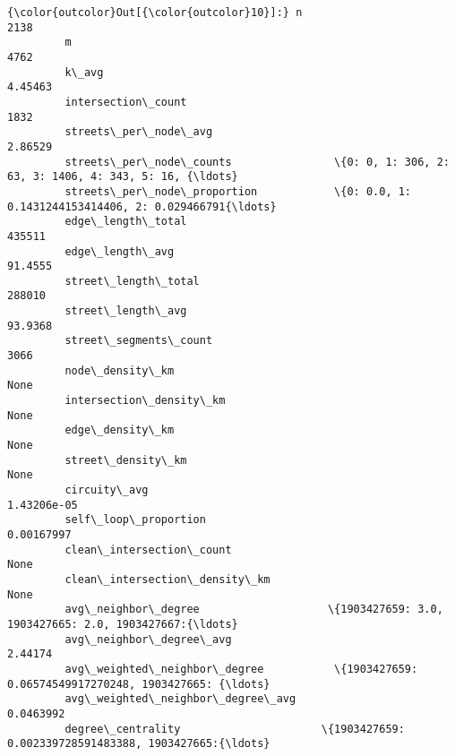 \documentclass[11pt]{article}
\begin{document}
\begin{Verbatim}[commandchars=\\\{\}]
{\color{outcolor}Out[{\color{outcolor}10}]:} n                                                                                   2138
         m                                                                                   4762
         k\_avg                                                                            4.45463
         intersection\_count                                                                  1832
         streets\_per\_node\_avg                                                             2.86529
         streets\_per\_node\_counts                \{0: 0, 1: 306, 2: 63, 3: 1406, 4: 343, 5: 16, {\ldots}
         streets\_per\_node\_proportion            \{0: 0.0, 1: 0.1431244153414406, 2: 0.029466791{\ldots}
         edge\_length\_total                                                                 435511
         edge\_length\_avg                                                                  91.4555
         street\_length\_total                                                               288010
         street\_length\_avg                                                                93.9368
         street\_segments\_count                                                               3066
         node\_density\_km                                                                     None
         intersection\_density\_km                                                             None
         edge\_density\_km                                                                     None
         street\_density\_km                                                                   None
         circuity\_avg                                                                 1.43206e-05
         self\_loop\_proportion                                                          0.00167997
         clean\_intersection\_count                                                            None
         clean\_intersection\_density\_km                                                       None
         avg\_neighbor\_degree                    \{1903427659: 3.0, 1903427665: 2.0, 1903427667:{\ldots}
         avg\_neighbor\_degree\_avg                                                          2.44174
         avg\_weighted\_neighbor\_degree           \{1903427659: 0.06574549917270248, 1903427665: {\ldots}
         avg\_weighted\_neighbor\_degree\_avg                                               0.0463992
         degree\_centrality                      \{1903427659: 0.002339728591483388, 1903427665:{\ldots}

\end{Verbatim}
\end{document}
